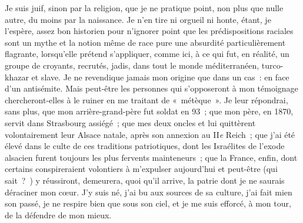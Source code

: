 \documentclass[french,twoside]{book} %
\begin{document}
Je suis juif, sinon par la religion, que je ne pratique point, non plus que nulle autre, du moins par la naissance. Je n’en tire ni orgueil ni honte, étant, je l’espère, assez bon historien pour n’ignorer point que les prédispositions raciales sont un mythe et la notion même de race pure une absurdité particulièrement flagrante, lorsqu’elle prétend s’appliquer, comme ici, à ce qui fut, en réalité, un groupe de croyants, recrutés, jadis, dans tout le monde méditerranéen, turco-khazar et slave. Je ne revendique jamais mon origine que dans un cas : en face d’un antisémite. Mais peut-être les personnes qui s’opposeront à mon témoignage chercheront-elles à le ruiner en me traitant de « métèque ». Je leur répondrai, sans plus, que mon arrière-grand-père fut soldat en 93 ; que mon père, en 1870, servit dans Strasbourg assiégé ; que mes deux oncles et lui quittèrent volontairement leur Alsace natale, après son annexion au II\emph{e} Reich ; que j’ai été élevé dans le culte de ces traditions patriotiques, dont les Israélites de l’exode alsacien furent toujours les plus fervents mainteneurs ; que la France, enfin, dont certains conspireraient volontiers à m’expulser aujourd’hui et peut-être (qui sait ? ) y réussiront, demeurera, quoi qu’il arrive, la patrie dont je ne saurais déraciner mon cœur. J’y suis né, j’ai bu aux sources de sa culture, j’ai fait mien son passé, je ne respire bien que sous son ciel, et je me suis efforcé, à mon tour, de la défendre de mon mieux.\par
\end{document}
